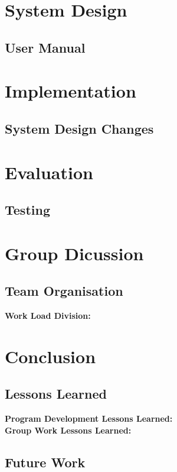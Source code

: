 \documentclass[11pt]{article}
\begin{document}
	\section{System Design}
	\subsection{User Manual}
	\section{Implementation} %
	\subsection{System Design Changes}
	\section{Evaluation} %
	\subsection{Testing} %
	\section{Group Dicussion}
	\subsection{Team Organisation} %
	\textbf{Work Load Division:}\\ 
	\section{Conclusion}
	\subsection{Lessons Learned} 
	\textbf{Program Development Lessons Learned:}\\ %
	\textbf{Group Work Lessons Learned:}\\ %
	\subsection{Future Work} %
\end{document}
